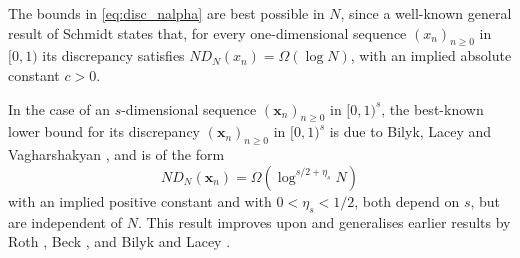 \documentclass{article}
\newcommand{\bsx}{\boldsymbol{x}}%
\renewcommand{\(}{\left (}
\renewcommand{\)}{\right )}
\theoremstyle{definition}
\numberwithin{equation}{section}
\begin{document}
The bounds in \eqref{eq:disc_nalpha} are best possible in $N$, since a well-known general result of Schmidt \cite{schmidt} states that, for every one-dimensional sequence $(x_n)_{n\geq 0}$ in $[0,1)$ its discrepancy satisfies $ND_N(x_n)=\Omega(\log N)$, with an implied absolute constant $c>0$. 





In the case of an $s$-dimensional sequence $(\bsx_n)_{n\geq 0}$ in $[0,1)^s$, the best-known lower bound for its discrepancy $(\bsx_n)_{n\geq 0}$ in $[0,1)^s$ is due to Bilyk, Lacey and Vagharshakyan \cite{BLV}, and is of the form 
$$ND_N(\bsx_n)=\Omega (\log^{s/2 +\eta_s} N)$$
 with an implied positive constant and with $0<\eta_s<1/2$, both depend on $s$, but are independent of $N$. This result improves upon and generalises earlier results by Roth \cite{roth}, Beck \cite{beck}, and Bilyk and Lacey \cite{BL}. 
\end{document}
